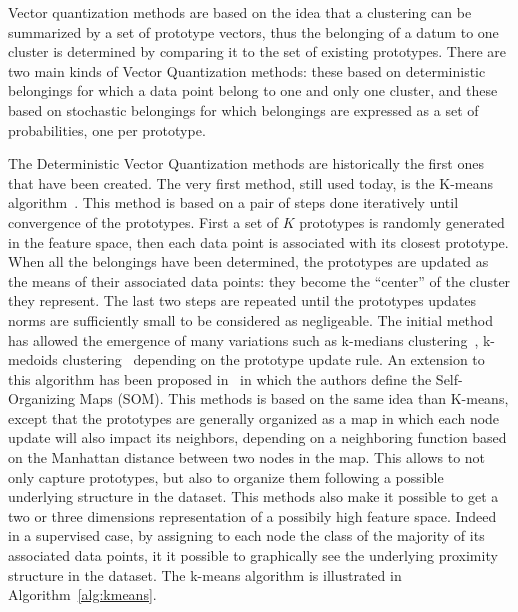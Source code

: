 \documentclass[a4paper]{report}
\begin{document}
    Vector quantization methods are based on the idea that a clustering can be summarized by a set of prototype vectors, thus the belonging of a datum to one cluster is determined by comparing it to the set of existing prototypes. There are two main kinds of Vector Quantization methods: these based on deterministic belongings for which a data point belong to one and only one cluster, and these based on stochastic belongings for which belongings are expressed as a set of probabilities, one per prototype. 

    The Deterministic Vector Quantization methods are historically the first ones that have been created. The very first method, still used today, is the K-means algorithm~\cite{macqueen1967some}. This method is based on a pair of steps done iteratively until convergence of the prototypes. First a set of $K$ prototypes is randomly generated in the feature space, then each data point is associated with its closest prototype. When all the belongings have been determined, the prototypes are updated as the means of their associated data points: they become the ``center'' of the cluster they represent. The last two steps are repeated until the prototypes updates norms are sufficiently small to be considered as negligeable. The initial method has allowed the emergence of many variations such as k-medians clustering~\cite{jain1988algorithms}, k-medoids clustering~\cite{kaufman1987clustering} depending on the prototype update rule. An extension to this algorithm has been proposed in~\cite{kohonen1998self} in which the authors define the Self-Organizing Maps (SOM). This methods is based on the same idea than K-means, except that the prototypes are generally organized as a map in which each node update will also impact its neighbors, depending on a neighboring function based on the Manhattan distance between two nodes in the map. This allows to not only capture prototypes, but also to organize them following a possible underlying structure in the dataset. This methods also make it possible to get a two or three dimensions representation of a possibily high feature space. Indeed in a supervised case, by assigning to each node the class of the majority of its associated data points, it it possible to graphically see the underlying proximity structure in the dataset. The k-means algorithm is illustrated in Algorithm~\ref{alg:kmeans}.
\end{document}
